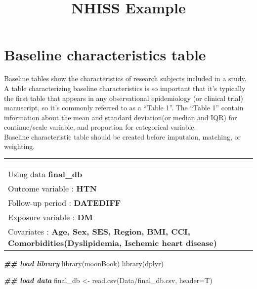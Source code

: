 \documentclass[
]{book}
\title{NHISS Example}
\author{}
\date{\vspace{-2.5em}}
\newenvironment{Shaded}{\begin{snugshade}}{\end{snugshade}}
\newcommand{\AttributeTok}[1]{\textcolor[rgb]{0.77,0.63,0.00}{#1}}
\newcommand{\DocumentationTok}[1]{\textcolor[rgb]{0.56,0.35,0.01}{\textbf{\textit{#1}}}}
\newcommand{\FunctionTok}[1]{\textcolor[rgb]{0.00,0.00,0.00}{#1}}
\newcommand{\NormalTok}[1]{#1}
\newcommand{\OtherTok}[1]{\textcolor[rgb]{0.56,0.35,0.01}{#1}}
\newcommand{\StringTok}[1]{\textcolor[rgb]{0.31,0.60,0.02}{#1}}
\begin{document}
\maketitle

{
\setcounter{tocdepth}{1}
\tableofcontents
}
\hypertarget{baseline-characteristics-table}{%
\chapter{Baseline characteristics table}\label{baseline-characteristics-table}}

Baseline tables show the characteristics of research subjects included in a study. A table characterizing baseline characteristics is so important that it's typically the first table that appears in any observational epidemiology (or clinical trial) manuscript, so it's commonly referred to as a ``Table 1''. The ``Table 1'' contain information about the mean and standard deviation(or median and IQR) for continue/scale variable, and proportion for categorical variable.\\

Baseline characteristic table should be created before imputaion, matching, or weighting.

\begin{center}\rule{0.5\linewidth}{0.5pt}\end{center}

\begin{longtable}[]{@{}l@{}}
\toprule()
\endhead
Using data \textbf{final\_db} \\
Outcome variable : \textbf{HTN} \\
Follow-up period : \textbf{DATEDIFF} \\
Exposure variable : \textbf{DM} \\
Covariates : \textbf{Age, Sex, SES, Region, BMI, CCI, Comorbidities(Dyslipidemia, Ischemic heart disease)} \\
\bottomrule()
\end{longtable}

\begin{Shaded}
\begin{Highlighting}[]
\DocumentationTok{\#\# load library}
\FunctionTok{library}\NormalTok{(moonBook)}
\FunctionTok{library}\NormalTok{(dplyr)}
\end{Highlighting}
\end{Shaded}

\begin{Shaded}
\begin{Highlighting}[]
\DocumentationTok{\#\# load data}
\NormalTok{final\_db }\OtherTok{\textless{}{-}} \FunctionTok{read.csv}\NormalTok{(}\StringTok{\textquotesingle{}Data/final\_db.csv\textquotesingle{}}\NormalTok{, }\AttributeTok{header=}\NormalTok{T)}
\end{Highlighting}
\end{Shaded}
\end{document}
